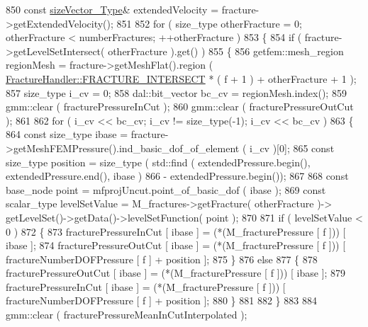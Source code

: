 \begin{DoxyCode}
850         \textcolor{keyword}{const} \hyperlink{Core_8h_a83c51913d041a5001e8683434c09857f}{sizeVector\_Type}& extendedVelocity = fracture->getExtendedVelocity();
851 
852         \textcolor{keywordflow}{for} ( size\_type otherFracture = 0; otherFracture < numberFractures; ++otherFracture )
853         \{
854             \textcolor{keywordflow}{if} ( fracture->getLevelSetIntersect( otherFracture ).get() )
855             \{
856                 getfem::mesh\_region regionMesh = fracture->getMeshFlat().region ( 
      \hyperlink{classFractureHandler_a495ad4fc72d0c47c8f0424842f1153aaa781cae3f3b99bf9357fed2833d315537}{FractureHandler::FRACTURE\_INTERSECT} * ( f + 1 ) + otherFracture + 1 );
857                 size\_type i\_cv = 0;
858                 dal::bit\_vector bc\_cv = regionMesh.index();
859                 gmm::clear ( fracturePressureInCut );
860                 gmm::clear ( fracturePressureOutCut );
861 
862                 \textcolor{keywordflow}{for} ( i\_cv << bc\_cv; i\_cv != size\_type(-1); i\_cv << bc\_cv )
863                 \{
864                     \textcolor{keyword}{const} size\_type ibase = fracture->getMeshFEMPressure().ind\_basic\_dof\_of\_element ( i\_cv 
      )[0];
865                     \textcolor{keyword}{const} size\_type position = size\_type ( std::find ( extendedPressure.begin(), 
      extendedPressure.end(), ibase )
866                                                 - extendedPressure.begin());
867 
868                     \textcolor{keyword}{const} base\_node point = mfprojUncut.point\_of\_basic\_dof ( ibase );
869                     \textcolor{keyword}{const} scalar\_type levelSetValue = M\_fractures->getFracture( otherFracture )->
      getLevelSet()->getData()->levelSetFunction( point );
870 
871                     \textcolor{keywordflow}{if} ( levelSetValue < 0 )
872                     \{
873                         fracturePressureInCut [ ibase ] = (*(M\_fracturePressure [ f ])) [ ibase ];
874                         fracturePressureOutCut [ ibase ] = (*(M\_fracturePressure [ f ])) [ 
      fractureNumberDOFPressure [ f ] + position ];
875                     \}
876                     \textcolor{keywordflow}{else}
877                     \{
878                         fracturePressureOutCut [ ibase ] = (*(M\_fracturePressure [ f ])) [ ibase ];
879                         fracturePressureInCut [ ibase ] = (*(M\_fracturePressure [ f ])) [ 
      fractureNumberDOFPressure [ f ] + position ];
880                     \}
881 
882                 \}
883 
884                 gmm::clear ( fracturePressureMeanInCutInterpolated );

\end{DoxyCode}
